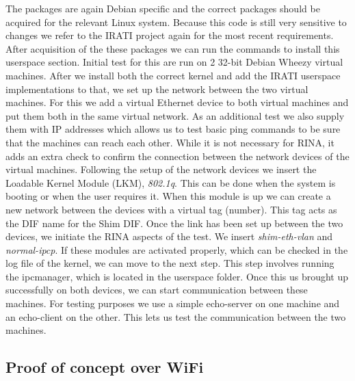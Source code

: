 The packages are again Debian specific and the correct packages should be acquired for the relevant Linux system. Because this code is still very sensitive to changes we refer to the IRATI project again for the most recent requirements. After acquisition of the these packages we can run the commands to install this userspace section. 
\npar
Initial test for this are run on 2 32-bit Debian Wheezy virtual machines. After we install both the correct kernel and add the IRATI userspace implementations to that, we set up the network between the two virtual machines. For this we add a virtual Ethernet device to both virtual machines and put them both in the same virtual network. As an additional test we also supply them with IP addresses which allows us to test basic ping commands to be sure that the machines can reach each other. While it is not necessary for RINA, it adds an extra check to confirm the connection between the network devices of the virtual machines. 
\npar
Following the setup of the network devices we insert the Loadable Kernel Module (LKM), \emph{802.1q}. This can be done when the system is booting or when the user requires it. When this module is up we can create a new network between the devices with a virtual tag (number). This tag acts as the DIF name for the Shim DIF. Once the link has been set up between the two devices, we initiate the RINA aspects of the test. We insert \emph{shim-eth-vlan} and \emph{normal-ipcp}. If these modules are activated properly, which can be checked in the log file of the kernel, we can move to the next step. This step involves running the ipcmanager, which is located in the userspace folder. Once this us brought up successfully on both devices, we can start communication between these machines. For testing purposes we use a simple echo-server on one machine and an echo-client on the other. This lets us test the communication between the two machines. 

\subsection{Proof of concept over WiFi}


